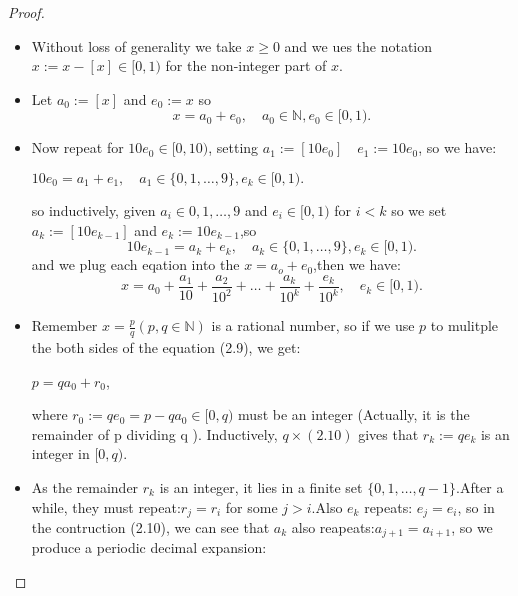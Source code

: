 \documentclass[a4paper]{article}
\begin{document}
\begin{proof}
    \begin{itemize}
        \item Without loss of generality we take $x\geq 0$ and we ues the notation ${x}:=x-[x]\in [0,1)$ for the non-integer part of $x$.
        \item Let $a_0:=[x]$ and $e_0:={x}$ so 
            \begin{equation}
            x=a_0+e_0, \quad a_0 \in \mathbb{N},e_0\in [0,1). \tag{2.9}
            \end{equation}
        \item  
            Now repeat for $10e_0 \in [0,10)$, setting $a_1:=[10e_0] \quad e_1:={10e_0}$, so we have:
            \begin{center}
            $10e_0=a_1+e_1, \quad a_1\in \{0,1,\ldots,9\},e_k\in [0,1).$
            \end{center} 
            so inductively, given $a_i \in {0,1,\ldots,9}$ and $e_i\in [0,1)$ for $i<k$ so we set $a_k:=[10e_{k-1}]$ and $e_k:={10e_{k-1}}$,so
            \begin{equation}
            10e_{k-1}=a_k+e_k, \quad  a_k\in \{0,1,\ldots,9\},e_k\in [0,1). \tag{2.10}
            \end{equation}
            and we plug each eqation into the $x=a_o+e_0$,then we have:
            \begin{equation}
                x=a_0+\frac{a_1}{10}+\frac{a_2}{10^2}+\ldots+\frac{a_k}{10^k}+\frac{e_k}{10^k},\quad e_k\in[0,1).\tag{2.11}
            \end{equation}
        \item Remember $x=\frac{p}{q}(p,q\in \mathbb{N})$ is a rational number, so if we use $p$ to mulitple the both sides of the equation (2.9), we get:
            \begin{center}  
                $p=qa_0+r_0$,
            \end{center}
        where $r_0:=qe_0=p-qa_0\in [0,q)$ must be an integer (Actually, it is the remainder of p dividing q ). Inductively, $q\times (2.10)$ gives that $r_k:=qe_k$ is an integer in $[0,q)$.
        \item As the remainder $r_k$ is an integer, it lies in a finite set $\{0,1,\ldots,q-1\}$.After a while, they must repeat:$r_j=r_i$ for some $j>i$.Also $e_k$ repeats: $e_j=e_i$, so in the contruction (2.10), we can see that $a_k$ also reapeats:$a_{j+1}=a_{i+1}$, so we produce a periodic decimal expansion:
            \begin{equation}

\end{equation}
\end{itemize}
\end{proof}
\end{document}
